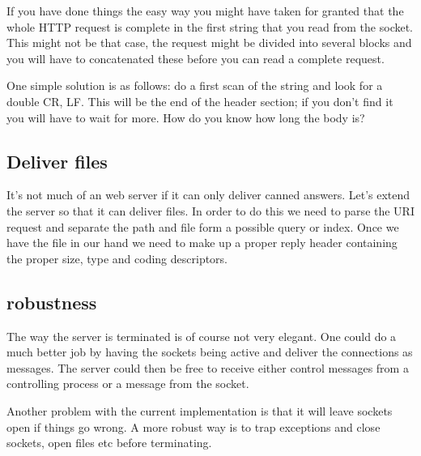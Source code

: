 \documentclass[a4paper, 11pt]{article}
\begin{document}
If you have done things the easy way you might have taken for granted
that the whole HTTP request is complete in the first string that you
read from the socket. This might not be that case, the request might be
divided into several blocks and you will have to concatenated these
before you can read a complete request. 

One simple solution is as follows: do a first scan of the string and
look for a double CR, LF. This will be the end of the header section;
if you don't find it you will have to wait for more. How do you know
how long the body is?

\subsection{Deliver files}

It's not much of an web server if it can only deliver canned
answers. Let's extend the server so that it can deliver files. In
order to do this we need to parse the URI request and separate the
path and file form a possible query or index. Once we have the file in
our hand we need to make up a proper reply header containing the
proper size, type and coding descriptors.

\subsection{robustness}

The way the server is terminated is of course not very elegant. One
could do a much better job by having the sockets being active and
deliver the connections as messages. The server could then be free to
receive either control messages from a controlling process or a message
from the socket. 

Another problem with the current implementation is that it will leave
sockets open if things go wrong. A more robust way is to trap
exceptions and close sockets, open files etc before terminating. 
\end{document}
